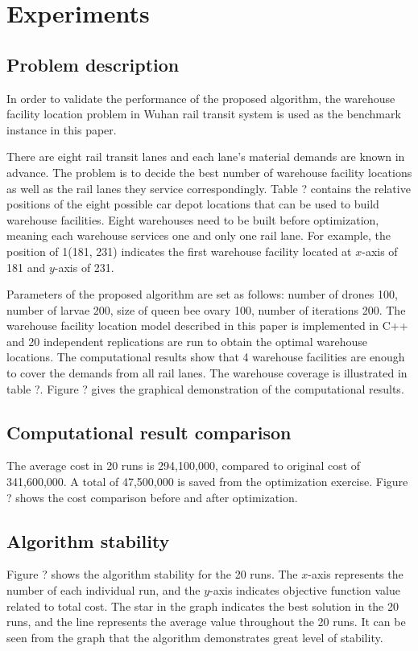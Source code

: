 \section{Experiments}
\subsection{Problem description}
In order to validate the performance of the proposed algorithm, the warehouse facility location problem in Wuhan rail transit system is used as the benchmark instance in this paper.

There are eight rail transit lanes and each lane's material demands are known in advance.
The problem is to decide the best number of warehouse facility locations as well as the rail lanes they service correspondingly.
Table ? contains the relative positions of the eight possible car depot locations that can be used to build warehouse facilities.
Eight warehouses need to be built before optimization, meaning each warehouse services one and only one rail lane.
For example, the position of 1(181, 231) indicates the first warehouse facility located at $x$-axis of 181 and $y$-axis of 231.

Parameters of the proposed algorithm are set as follows: number of drones 100, number of larvae 200, size of queen bee ovary 100, number of iterations 200.
The warehouse facility location model described in this paper is implemented in C++ and 20 independent replications are run to obtain the optimal warehouse locations.
The computational results show that 4 warehouse facilities are enough to cover the demands from all rail lanes.
The warehouse coverage is illustrated in table ?.
Figure ? gives the graphical demonstration of the computational results.

\subsection{Computational result comparison}
The average cost in 20 runs is 294,100,000, compared to original cost of 341,600,000.
A total of 47,500,000 is saved from the optimization exercise.
Figure ? shows the cost comparison before and after optimization.

\subsection{Algorithm stability}
Figure ? shows the algorithm stability for the 20 runs.
The $x$-axis represents the number of each individual run, and the $y$-axis indicates objective function value related to total cost.
The star in the graph indicates the best solution in the 20 runs, and the line represents the average value throughout the 20 runs.
It can be seen from the graph that the algorithm demonstrates great level of stability.


